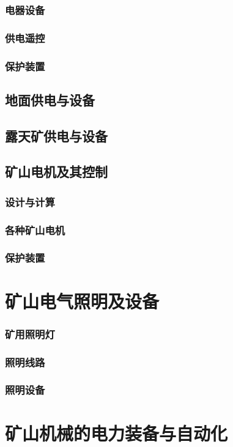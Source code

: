 \documentclass[UTF8]{../../ApplicationUniverse}
\begin{document}
        \subsubsection{电器设备}
        \subsubsection{供电遥控}
        \subsubsection{保护装置}
    \subsection{地面供电与设备}
    \subsection{露天矿供电与设备}
    \subsection{矿山电机及其控制}
        \subsubsection{设计与计算}
        \subsubsection{各种矿山电机}
        \subsubsection{保护装置}
\section{矿山电气照明及设备}
    \subsubsection{矿用照明灯}
    \subsubsection{照明线路}
    \subsubsection{照明设备}
\section{矿山机械的电力装备与自动化}
\end{document}
